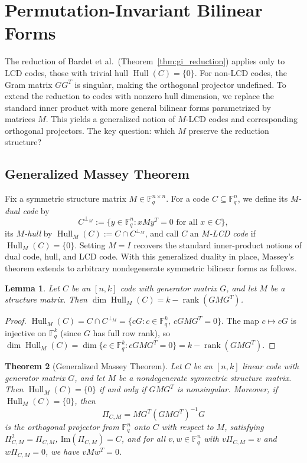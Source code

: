 \documentclass[11pt]{article}
\newcommand{\FF}{\mathbb{F}}
\newcommand{\0}{\mathbf{0}}
\newcommand{\1}{\mathbf{1}}
\DeclareMathOperator{\Hull}{Hull}
\DeclareMathOperator{\rank}{rank}
\theoremstyle{plain}
\newtheorem{theorem}{Theorem}[section]
\newtheorem{lemma}[theorem]{Lemma}
\theoremstyle{definition}
\theoremstyle{remark}
\begin{document}
\section{Permutation-Invariant Bilinear Forms}
\label{sec:extension}

The reduction of Bardet et al.\ (Theorem~\ref{thm:gi_reduction}) applies only to LCD codes, those with trivial hull $\Hull(C) = \{0\}$. For non-LCD codes, the Gram matrix $GG^T$ is singular, making the orthogonal projector undefined. To extend the reduction to codes with nonzero hull dimension, we replace the standard inner product with more general bilinear forms parametrized by matrices $M$. This yields a generalized notion of $M$-LCD codes and corresponding orthogonal projectors. The key question: which $M$ preserve the reduction structure?

\subsection{Generalized Massey Theorem}

Fix a symmetric structure matrix $M \in \FF_q^{n \times n}$. For a code $C \subseteq \FF_q^n$, we define its \emph{$M$-dual code} by
\[
C^{\perp_M} := \{y \in \FF_q^n : xMy^T = 0 \text{ for all } x \in C\},
\]
its \emph{$M$-hull} by $\Hull_M(C) := C \cap C^{\perp_M}$, and call $C$ an \emph{$M$-LCD code} if $\Hull_M(C) = \{0\}$. Setting $M = I$ recovers the standard inner-product notions of dual code, hull, and LCD code. With this generalized duality in place, Massey's theorem extends to arbitrary nondegenerate symmetric bilinear forms as follows.

\begin{lemma}
\label{lem:hull_dimension}
Let $C$ be an $[n,k]$ code with generator matrix $G$, and let $M$ be a structure matrix. Then $\dim \Hull_M(C) = k - \rank(GMG^T)$.
\end{lemma}
\begin{proof}
$\Hull_M(C) = C \cap C^{\perp_M} = \{cG : c \in \FF_q^k,\ cGMG^T = 0\}$. The map $c \mapsto cG$ is injective on $\FF_q^k$ (since $G$ has full row rank), so $\dim \Hull_M(C) = \dim\{c \in \FF_q^k : cGMG^T = 0\} = k - \rank(GMG^T)$.
\end{proof}

\begin{theorem}[Generalized Massey Theorem]
\label{thm:generalized_massey}
Let $C$ be an $[n,k]$ linear code with generator matrix $G$, and let $M$ be a nondegenerate symmetric structure matrix. Then $\Hull_M(C) = \{0\}$ if and only if $GMG^T$ is nonsingular. Moreover, if $\Hull_M(C) = \{0\}$, then
$$\Pi_{C,M} = MG^T(GMG^T)^{-1}G$$
is the orthogonal projector from $\FF_q^n$ onto $C$ with respect to $M$, satisfying $\Pi_{C,M}^2 = \Pi_{C,M}$, $\text{Im}(\Pi_{C,M}) = C$, and for all $v, w \in \FF_q^n$ with $v\Pi_{C,M} = v$ and $w\Pi_{C,M} = 0$, we have $vMw^T = 0$.
\end{theorem}
\end{document}

